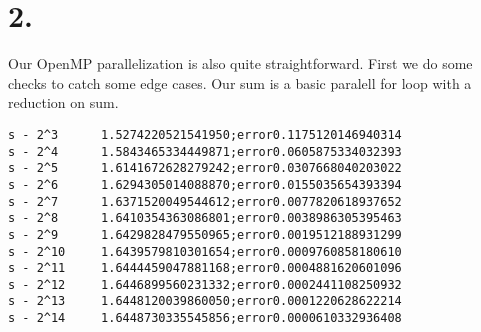 \section{2.}
Our OpenMP parallelization is also quite straightforward. First we do some checks to catch some edge cases. Our sum is a basic paralell for loop with a reduction on sum.

\begin{verbatim}
s - 2^3 	 1.5274220521541950;error0.1175120146940314
s - 2^4 	 1.5843465334449871;error0.0605875334032393
s - 2^5 	 1.6141672628279242;error0.0307668040203022
s - 2^6 	 1.6294305014088870;error0.0155035654393394
s - 2^7 	 1.6371520049544612;error0.0077820618937652
s - 2^8 	 1.6410354363086801;error0.0038986305395463
s - 2^9 	 1.6429828479550965;error0.0019512188931299
s - 2^10 	 1.6439579810301654;error0.0009760858180610
s - 2^11 	 1.6444459047881168;error0.0004881620601096
s - 2^12 	 1.6446899560231332;error0.0002441108250932
s - 2^13 	 1.6448120039860050;error0.0001220628622214
s - 2^14 	 1.6448730335545856;error0.0000610332936408
\end{verbatim}
